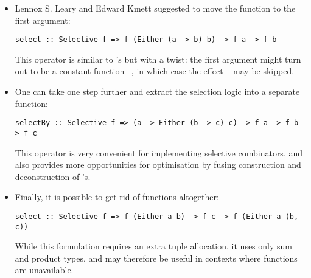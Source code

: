\begin{itemize}
    \item Lennox S. Leary and Edward Kmett suggested to move the function to the
          first argument:

\vspace{1mm}
\begin{verbatim}
select :: Selective f => f (Either (a -> b) b) -> f a -> f b
\end{verbatim}
\vspace{1mm}

          This operator is similar to 's \hs{<*>} but with a
          twist: the first argument might turn out to be a constant function
          ~, in which case the effect ~ may be
          skipped.

    \item One can take one step further and extract the selection logic into a
          separate function:

\vspace{1mm}
\begin{verbatim}
selectBy :: Selective f => (a -> Either (b -> c) c) -> f a -> f b -> f c
\end{verbatim}
\vspace{1mm}

         This operator is very convenient for implementing selective
         combinators, and also provides more opportunities for optimisation by
         fusing construction and deconstruction of 's.

    \item Finally, it is possible to get rid of functions altogether:

\vspace{1mm}
\begin{verbatim}
select :: Selective f => f (Either a b) -> f c -> f (Either a (b, c))
\end{verbatim}
\vspace{1mm}

          While this formulation requires an extra tuple allocation, it uses
          only sum and product types, and may therefore be useful in contexts
          where functions are unavailable.
\end{itemize}





